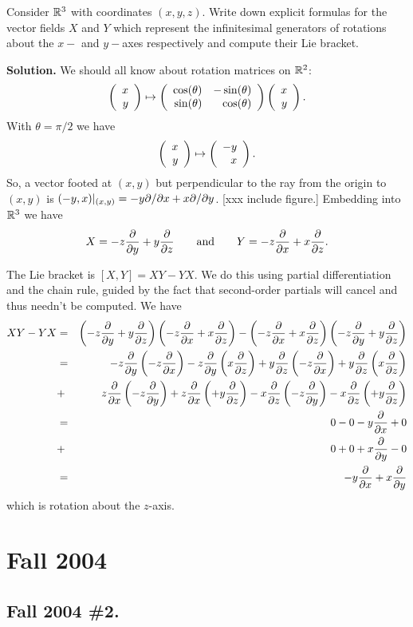 \documentclass[10pt]{article}
\numberwithin{equation}{subsection}
\begin{document}
Consider $\mathbb{R}^3$ with coordinates $(x,y,z)$.  Write down explicit formulas
for the vector fields $X$ and $Y$ which represent the infinitesimal
generators of rotations about the $x-$ and $y-$axes respectively and
compute their Lie bracket.

\textbf{Solution.}  We should all know about rotation matrices on $\mathbb{R}^2$:
$$
	\left(\begin{array}{r} x \\ y \end{array}\right) \mapsto
	\left(\begin{array}{rr}
		\cos(\theta) & -\sin(\theta) \\
		\sin(\theta) &  \cos(\theta) \\
	\end{array}\right)
	\left(\begin{array}{r} x \\ y \end{array}\right).
$$
With $\theta=\pi/2$ we have
$$
	\left(\begin{array}{r} x \\ y \end{array}\right) \mapsto \left(\begin{array}{r} -y \\ x \end{array}\right).
$$
So, a vector footed at $(x,y)$ but perpendicular to the ray from the
origin to $(x,y)$ is $(-y,x)|_{(x,y)} = -y \partial/\partial x + x \partial/\partial y$.
[xxx include figure.]
Embedding into $\mathbb{R}^3$ we have
$$
	X = -z \frac{\partial}{\partial y} + y \frac{\partial}{\partial z} \qquad\textrm{and}\qquad
	Y = -z \frac{\partial}{\partial x} + x \frac{\partial}{\partial z}.
$$

The Lie bracket is $[X,Y] = XY-YX$.  We do this using partial differentiation
and the chain rule, guided by the fact that second-order partials will cancel
and thus needn't be computed.  We have
\begin{eqnarray*}
	XY - YX &=& \left( -z \frac{\partial}{\partial y} + y \frac{\partial}{\partial z} \right)
		\left( -z \frac{\partial}{\partial x} + x \frac{\partial}{\partial z} \right)
	 	-\left( -z \frac{\partial}{\partial x} + x \frac{\partial}{\partial z} \right)
		\left( -z \frac{\partial}{\partial y} + y \frac{\partial}{\partial z} \right) \\
	&=& -z \frac{\partial}{\partial y} \left( -z \frac{\partial}{\partial x}\right)
		-z \frac{\partial}{\partial y} \left( x \frac{\partial}{\partial z} \right)
		+y \frac{\partial}{\partial z} \left( -z \frac{\partial}{\partial x}  \right)
		+y \frac{\partial}{\partial z} \left( x \frac{\partial}{\partial z} \right) \\
	&+& z \frac{\partial}{\partial x} \left( -z \frac{\partial}{\partial y} \right)
		+z \frac{\partial}{\partial x} \left( +y \frac{\partial}{\partial z} \right)
		-x \frac{\partial}{\partial z} \left( -z \frac{\partial}{\partial y} \right)
		-x \frac{\partial}{\partial z} \left( +y \frac{\partial}{\partial z} \right) \\
	&=& 0
		-0
		-y \frac{\partial}{\partial x}
		+0 \\
	&+& 0
		+0
		+x \frac{\partial}{\partial y}
		-0 \\
	&=& -y \frac{\partial}{\partial x} +x \frac{\partial}{\partial y}
\end{eqnarray*}
which is rotation about the $z$-axis.

\newpage
\section{Fall 2004}

\subsection{Fall 2004 \#2.}
\end{document}
